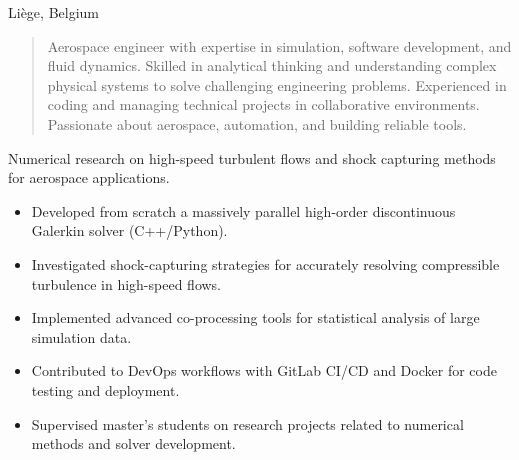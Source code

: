 \documentclass[10pt,a4paper,ragged2e,withhyper]{altacv}
\begin{document}
\begin{paracol}{2}


\divider

 {Liège, Belgium}

\divider


\switchcolumn
{}

\begin{quote}
Aerospace engineer with expertise in simulation, software development, and fluid dynamics. Skilled in analytical thinking and understanding complex physical systems to solve challenging engineering problems. Experienced in coding and managing technical projects in collaborative environments. Passionate about aerospace, automation, and building reliable tools.
\end{quote}

\end{paracol}


\textcolor{myRed}{Numerical research on high-speed turbulent flows and shock capturing methods for aerospace applications.}
\begin{itemize}[leftmargin=1.5em]
  \item Developed from scratch a massively parallel high-order discontinuous Galerkin solver (C++/Python).
  \item Investigated shock-capturing strategies for accurately resolving compressible turbulence in high-speed flows.
  \item Implemented advanced co-processing tools for statistical analysis of large simulation data.
  \item Contributed to DevOps workflows with GitLab CI/CD and Docker for code testing and deployment.
  \item Supervised master's students on research projects related to numerical methods and solver development.
\end{itemize}
\end{document}
